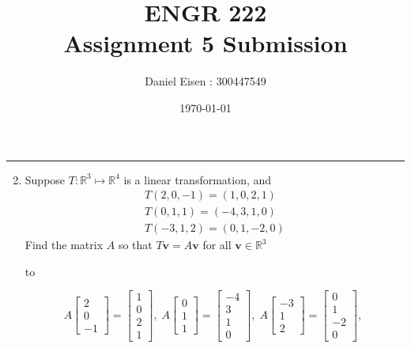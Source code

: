 \documentclass[11pt]{article}
\title{ENGR 222 \\ Assignment 5 Submission}
\author{Daniel Eisen : 300447549}
\date{\today}
\newcommand{\hdotrule}[1]{\hbox to \textwidth{\leaders\hbox to #1pt{\hss . \hss}\hfil}}
\begin{document}
\begin{preview}

      \maketitle
      \hrule
      \begin{enumerate}
            \setcounter{enumi}{1}
            \item Suppose $T : \mathbb{R}^3 \mapsto \mathbb{R}^4$ is a linear transformation, and
            \begin{align*}
                  T(2,0,-1) = (1,0,2,1)\\
                  T(0,1,1) = (-4,3,1,0)\\
                  T(-3,1,2) = (0,1,-2,0)
            \end{align*}
            Find the matrix $A$ so that $T\textbf{v}=A\textbf{v}$ for all $\textbf{v} \in \mathbb{R}^3$
            
            \hdotrule{5}

            $$
                  A \begin{bmatrix}2\\0\\-1\end{bmatrix} = \begin{bmatrix}1\\0\\2\\1\end{bmatrix}, \;
                  A \begin{bmatrix}0\\1\\1\end{bmatrix} = \begin{bmatrix}-4\\3\\1\\0\end{bmatrix}, \;
                  A \begin{bmatrix}-3\\1\\2\end{bmatrix} = \begin{bmatrix}0\\1\\-2\\0\end{bmatrix}, \;
            $$


\end{enumerate}
\end{preview}
\end{document}
